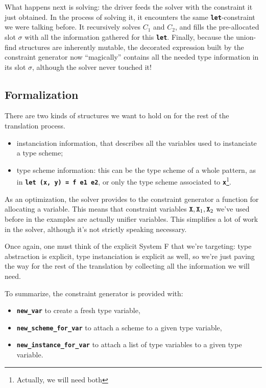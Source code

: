 \documentclass[10pt,a4paper,twoside,titlepage,twocolumn]{article}
\newcommand{\code}[1]{\textbf{\texttt{#1}}}
\begin{document}
What happens next is solving: the driver feeds the solver with the constraint it
just obtained. In the process of solving it, it encounters the same
\code{let}-constraint we were talking before.  It recursively solves $C_1$ and
$C_2$, and fills the pre-allocated slot $\sigma$ with all the information
gathered for this \code{let}.  Finally, because the union-find structures are
inherently mutable, the decorated expression built by the constraint generator
now ``magically'' contains all the needed type information in its slot $\sigma$,
although the solver never touched it!

\subsection{Formalization}

There are two kinds of structures we want to hold on for the rest of the
translation process.
\begin{itemize}
  \item instanciation information, that describes all the variables used to
    instanciate a type scheme;
  \item type scheme information: this can be the type scheme of a whole pattern,
    as in \code{let (x, y) = f e1 e2}, or only the type scheme associated to
    \code{x}\footnote{Actually, we will need both}.
\end{itemize}

As an optimization, the solver provides to the constraint generator a function
for allocating a variable. This means that constraint variables
$\tvar,\tvar_1,\tvar_2$ we've used before in the examples are actually unifier
variables. This simplifies a lot of work in the solver,
although it's not strictly speaking necessary.

Once again, one must think of the explicit System F that we're targeting: type
abstraction is explicit, type instanciation is explicit as well, so we're just
paving the way for the rest of the translation by collecting all the information
we will need.

To summarize, the constraint generator is provided with:
\begin{itemize}
  \item \code{new\_var} to create a fresh type variable,
  \item \code{new\_scheme\_for\_var} to attach a scheme to a given type
    variable,
  \item \code{new\_instance\_for\_var} to attach a list of type variables to a
    given type variable.
\end{itemize}
\end{document}

